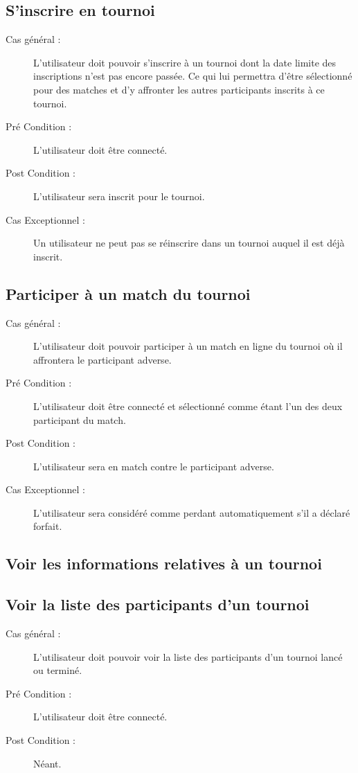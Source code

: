 \documentclass[a4paper]{report}
\begin{document}
\subsection{S'inscrire en tournoi}
\begin{description}
    \item[Cas général :] L'\gls{utilisateur} doit pouvoir s'inscrire à un tournoi dont la date limite des inscriptions n'est pas encore passée.
        Ce qui lui permettra d'être sélectionné pour des matches et d'y affronter les autres \glspl{participant} inscrits à ce tournoi.
    \item[Pré Condition  :] L'\gls{utilisateur} doit être connecté.
    \item[Post Condition :] L'\gls{utilisateur} sera inscrit pour le tournoi.
    \item[Cas Exceptionnel :] Un \gls{utilisateur} ne peut pas se réinscrire dans un tournoi auquel il est déjà inscrit.
\end{description} 

\subsection{Participer à un match du tournoi}
\begin{description}
    \item[Cas général :] L'\gls{utilisateur} doit pouvoir participer à un match en ligne du tournoi où il affrontera le \gls{participant} adverse.
    \item[Pré Condition  :] L'\gls{utilisateur} doit être connecté et sélectionné comme étant l'un des deux \gls{participant} du match.
    \item[Post Condition :] L'\gls{utilisateur} sera en match contre le \gls{participant} adverse.
    \item[Cas Exceptionnel :] L'\gls{utilisateur} sera considéré comme perdant automatiquement s'il a déclaré forfait.
\end{description}

\subsection{Voir les informations relatives à un tournoi}
\subsection{Voir la liste des \glspl{participant} d'un tournoi}
\begin{description}
    \item[Cas général :] L'\gls{utilisateur} doit pouvoir voir la liste des \glspl{participant} d'un tournoi lancé ou terminé.
    \item[Pré Condition  :] L'\gls{utilisateur} doit être connecté.
    \item[Post Condition :] Néant.
\end{description}
\end{document}
